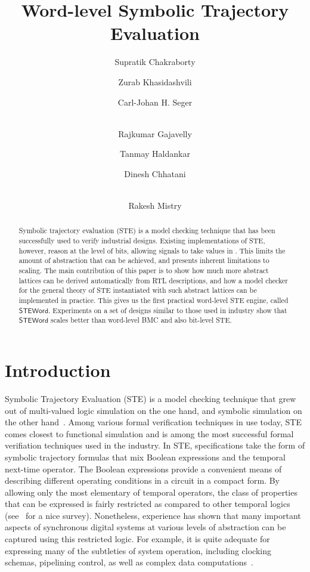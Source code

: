\documentclass{llncs}
\newcommand{\steword}{\ensuremath{\mathsf{STEWord}}}
\begin{document}
\title{Word-level Symbolic Trajectory Evaluation}

\author{Supratik Chakraborty \and 
Zurab Khasidashvili \and 
Carl-Johan H. Seger \and \\
Rajkumar Gajavelly \and
Tanmay Haldankar \and 
Dinesh Chhatani \and \\
Rakesh Mistry}

\maketitle

\begin{abstract}
Symbolic trajectory evaluation (STE) is a model checking technique
that has been successfully used to verify industrial designs.
Existing implementations of STE, however, reason at the level of bits,
allowing signals to take values in .  This limits the
amount of abstraction that can be achieved, and presents inherent
limitations to scaling.  The main contribution of this paper is to
show how much more abstract lattices can be derived automatically from
RTL descriptions, and how a model checker for the general theory of
STE instantiated with such abstract lattices can be implemented in
practice.  This gives us the first practical word-level STE engine,
called {\steword}.  Experiments on a set of designs similar to those
used in industry show that {\steword} scales better than
word-level BMC and also bit-level STE.
\end{abstract}

\section{Introduction}


Symbolic Trajectory Evaluation (STE) is a model checking technique
that grew out of multi-valued logic simulation on the one hand, and
symbolic simulation on the other hand~\cite{BryantSeger90}.  Among
various formal verification techniques in use today, STE comes closest
to functional simulation and is among the most successful formal
verifiation techniques used in the industry.  In STE, specifications
take the form of symbolic trajectory formulas that mix Boolean
expressions and the temporal next-time operator.  The Boolean
expressions provide a convenient means of describing different
operating conditions in a circuit in a compact form.  By allowing only
the most elementary of temporal operators, the class of properties
that can be expressed is fairly restricted as compared to other
temporal logics (see~\cite{Emerson95} for a nice survey).
Nonetheless, experience has shown that many important aspects of
synchronous digital systems at various levels of abstraction can be
captured using this restricted logic.  For example, it is quite
adequate for expressing many of the subtleties of system operation,
including clocking schemas, pipelining control, as well as complex
data
computations~\cite{SegerJOMABS05,KumarGuptaGhughal12,KaivolaEtAl09}.
\end{document}
